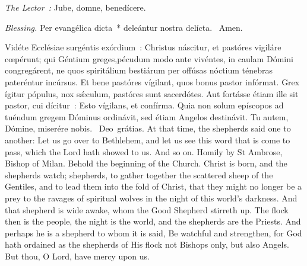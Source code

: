 {{  }

  {
    \bigskip
    {
    }
    \medskip

    \emph{The Lector~:} Jube, domne, benedícere.

    \emph{Blessing.} Per evangélica dicta~* deleántur nostra delícta. \Rbar{}~Amen.
  }

  \bigskip{}
  {


  }

  {

    \begin{parcolumns}[rulebetween,colwidths={1=.45\linewidth}]{2}
    {Vidéte Ecclésiae surgéntis exórdium~: Christus náscitur, et pastóres vigiláre cœpérunt; qui Géntium greges,}{pécudum modo ante vivéntes, in caulam Dómini congregárent, ne quos spiritálium bestiárum per offúsas nóctium ténebras pateréntur incúrsus. Et bene pastóres vígilant, quos bonus pastor infórmat. Grex ígitur pópulus, nox sǽculum, pastóres sunt sacerdótes. Aut fortásse étiam ille sit pastor, cui dícitur~: Esto vígilans, et confírma. Quia non solum epíscopos ad tuéndum gregem Dóminus ordinávit, sed étiam Angelos destinávit.
      Tu autem, Dómine, miserére nobis.
      \Rbar{}~Deo~grátias.}
    {At that time, the shepherds said one to another: Let us go over to Bethlehem, and let us see this word that is come to pass, which the Lord hath showed to us. And so on.}
    {Homily by St Ambrose, Bishop of Milan.}
    {Behold the beginning of the Church. Christ is born, and the shepherds watch; shepherds, to gather together the scattered sheep of the Gentiles, and to lead them into the fold of Christ, that they might no longer be a prey to the ravages of spiritual wolves in the night of this world's darkness. And that shepherd is wide awake, whom the Good Shepherd stirreth up. The flock then is the people, the night is the world, and the shepherds are the Priests. And perhaps he is a shepherd to whom it is said, Be watchful and strengthen, for God hath ordained as the shepherds of His flock not Bishops only, but also Angels.
      But thou, O Lord, have mercy upon us.}
    \end{parcolumns}

}}
